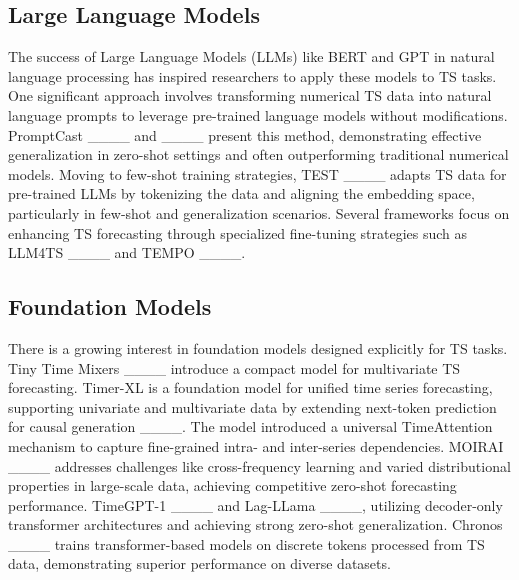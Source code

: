 \subsection{Large Language Models}

The success of Large Language Models (LLMs) like BERT and GPT in natural language processing has inspired researchers to apply these models to TS tasks.
One significant approach involves transforming numerical TS data into natural language prompts to leverage pre-trained language models without modifications. 
PromptCast ____ and ____ present this method, demonstrating effective generalization in zero-shot settings and often outperforming traditional numerical models. 
Moving to few-shot training strategies, TEST ____ adapts TS data for pre-trained LLMs by tokenizing the data and aligning the embedding space, particularly in few-shot and generalization scenarios.
Several frameworks focus on enhancing TS forecasting through specialized fine-tuning strategies such as LLM4TS ____ and TEMPO ____.


\subsection{Foundation Models}

There is a growing interest in foundation models designed explicitly for TS tasks. 
Tiny Time Mixers ____ introduce a compact model for multivariate TS forecasting.
Timer-XL is a foundation model for unified time series forecasting, supporting univariate and multivariate data by extending next-token prediction for causal generation ____.
The model introduced a universal TimeAttention mechanism to capture fine-grained intra- and inter-series dependencies.
MOIRAI ____ addresses challenges like cross-frequency learning and varied distributional properties in large-scale data, achieving competitive zero-shot forecasting performance.
TimeGPT-1 ____ and Lag-LLama ____, utilizing decoder-only transformer architectures and achieving strong zero-shot generalization.
Chronos ____ trains transformer-based models on discrete tokens processed from TS data, demonstrating superior performance on diverse datasets.
